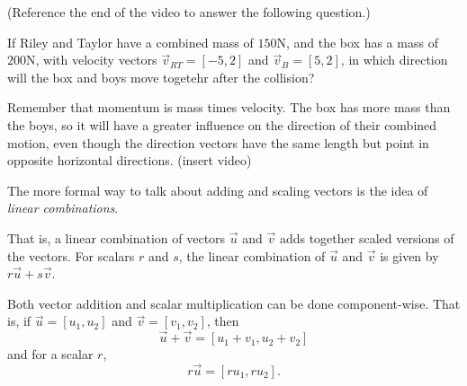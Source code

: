 \documentclass{ximera}
\begin{document}
\begin{problem}
    (Reference the end of the video to answer the following question.)
    
    If Riley and Taylor have a combined mass of $150$N, and the box has a mass of $200$N, with velocity vectors $\vec{v}_{RT}=[-5,2]$ and $\vec{v}_B=[5,2]$, in which direction will the box and boys move togetehr after the collision?
    \begin{multipleChoice}
    \end{multipleChoice}
    \begin{feedback}
        Remember that momentum is mass times velocity. The box has more mass than the boys, so it will have a greater influence on the direction of their combined motion, even though the direction vectors have the same length but point in opposite horizontal directions.
        (insert video)
    \end{feedback}
\end{problem}

\begin{definition}
The more formal way to talk about adding and scaling vectors is the idea of \emph{linear combinations}. 

That is, a linear combination of vectors $\vec{u}$ and $\vec{v}$ adds together scaled versions of the vectors. For scalars $r$ and $s$, the linear combination of $\vec{u}$ and $\vec{v}$ is given by $r\vec{u}+s\vec{v}$.
\end{definition}

\begin{remark}
    Both vector addition and scalar multiplication can be done component-wise. That is, if $\vec{u}=[u_1,u_2]$ and $\vec{v}=[v_1,v_2]$, then
    \[\vec{u}+\vec{v}=[u_1+v_1,u_2+v_2]\]
    and for a scalar $r$,
    \[r\vec{u}=[ru_1,ru_2].\]
\end{remark}
\end{document}
